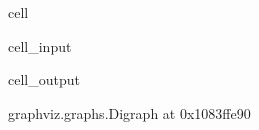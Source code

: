 \documentclass[letterpaper,10pt,english]{jupyterBook}
\begin{document}
\begin{sphinxuseclass}{cell}
\begin{sphinxVerbatimInput}
\begin{sphinxuseclass}{cell_input}
\end{sphinxuseclass}\end{sphinxVerbatimInput}
\begin{sphinxVerbatimOutput}

\begin{sphinxuseclass}{cell_output}
\begin{sphinxVerbatim}[commandchars=\\\{\}]
\PYGZlt{}graphviz.graphs.Digraph at 0x1083ffe90\PYGZgt{}
\end{sphinxVerbatim}

\end{sphinxuseclass}\end{sphinxVerbatimOutput}

\end{sphinxuseclass}
\sphinxAtStartPar
{}
\end{document}
